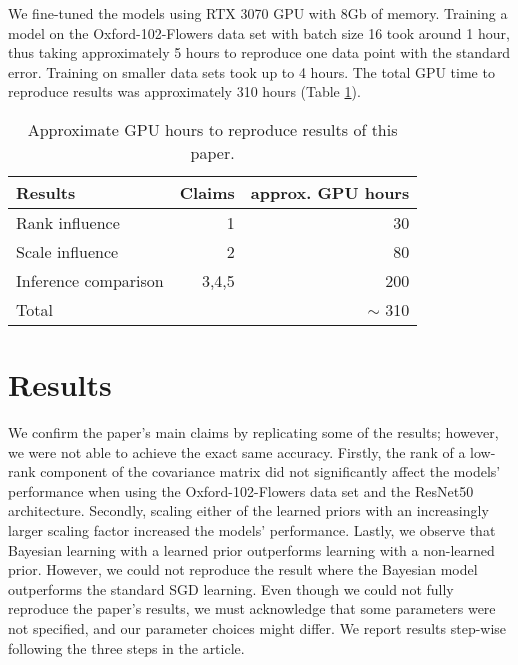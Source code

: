 We fine-tuned the models using RTX 3070 GPU with 8Gb of memory. Training a model on the Oxford-102-Flowers data set with batch size 16 took around 1 hour, thus taking approximately 5 hours to reproduce one data point with the standard error. Training on smaller data sets took up to 4 hours.
The total GPU time to reproduce results was approximately 310 hours (Table \ref{tab:gpu}).

\begin{table}[ht]
    \centering
    \begin{tabular}{l r r}
        \toprule
        Results & Claims & approx. GPU hours \\
        \midrule
        Rank influence & 1 & 30 \\
        Scale influence & 2 & 80 \\
        Inference comparison & 3,4,5 & 200 \\
        \midrule
        Total & & $\sim$ 310 \\
        \bottomrule
    \end{tabular}
    \caption{Approximate GPU hours to reproduce results of this paper.}
    \label{tab:gpu}
\end{table}

\section{Results}
\label{sec:results}

We confirm the paper's main claims by replicating some of the results; however, we were not able to achieve the exact same accuracy.
Firstly, the rank of a low-rank component of the covariance matrix did not significantly affect the models' performance when using the Oxford-102-Flowers data set and the ResNet50 architecture.
Secondly, scaling either of the learned priors with an increasingly larger scaling factor increased the models' performance.
Lastly, we observe that Bayesian learning with a learned prior outperforms learning with a non-learned prior. However, we could not reproduce the result where the Bayesian model outperforms the standard SGD learning.
Even though we could not fully reproduce the paper's results, we must acknowledge that some parameters were not specified, and our parameter choices might differ.
We report results step-wise following the three steps in the article.


